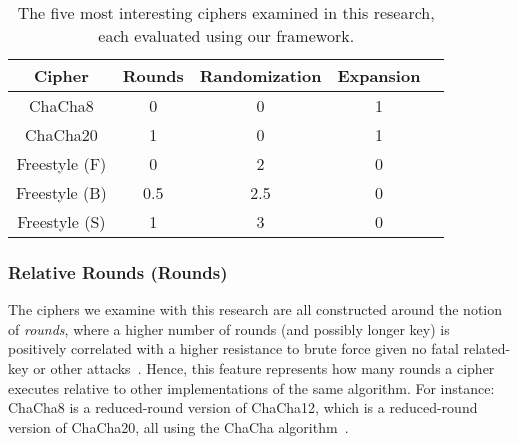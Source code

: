 \begin{table}[ht]
   \begin{tabular}{@{}ccccc@{}}
   \toprule
   \textbf{Cipher} & \textbf{Rounds} & \textbf{Randomization} &
   \textbf{Expansion} \\
   \midrule
   ChaCha8         & 0           & 0           & 1           \\
   ChaCha20        & 1           & 0           & 1           \\
   Freestyle (F)   & 0           & 2           & 0           \\
   Freestyle (B)   & 0.5         & 2.5         & 0           \\
   Freestyle (S)   & 1           & 3           & 0           \\
\end{tabular}
   \caption{The five most interesting ciphers examined in this research, each
   evaluated using our framework.}
   \label{tbl:security-quant}
 \end{table}

\subsubsection{Relative Rounds (Rounds)}

The ciphers we examine with this research are all constructed around the notion
of \emph{rounds}, where a higher number of rounds (and possibly longer key) is
positively correlated with a higher resistance to brute force given no fatal
related-key or other attacks~\cite{ChaCha-Cryptanalysis}. Hence, this feature
represents how many rounds a cipher executes relative to other implementations
of the same algorithm. For instance: ChaCha8 is a reduced-round version of
ChaCha12, which is a reduced-round version of ChaCha20, all using the ChaCha
algorithm~\cite{ChaCha20,ChaCha-Cryptanalysis}.

